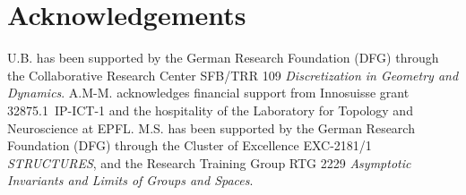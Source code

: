 
\section*{Acknowledgements}

U.B. has been supported by the German Research Foundation (DFG) through the Collaborative Research Center SFB/TRR 109 \emph{Discretization in Geometry and Dynamics}.
A.M-M. acknowledges financial support from Innosuisse grant \mbox{32875.1 IP-ICT-1} and the hospitality of the Laboratory for Topology and Neuroscience at EPFL.
M.S. has been supported by the German Research Foundation (DFG) through	the Cluster of Excellence EXC-2181/1 \emph{STRUCTURES}, and the Research Training Group RTG 2229 \emph{Asymptotic Invariants and Limits of Groups and Spaces}.